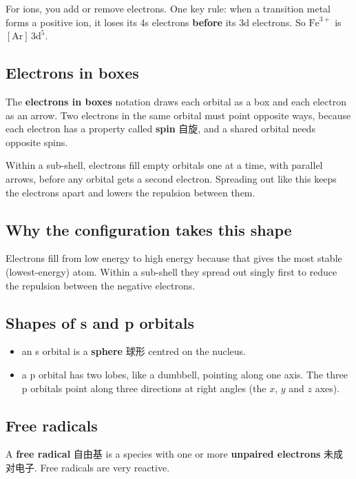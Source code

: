 \documentclass[11pt]{article}
\begin{document}
For ions, you add or remove electrons. One key rule: when a transition metal forms a positive ion, it loses its 4s electrons \textbf{before} its 3d electrons. So $\text{Fe}^{3+}$ is $[\text{Ar}]\,3\text{d}^5$.

\subsection*{Electrons in boxes}

The \textbf{electrons in boxes} notation draws each orbital as a box and each electron as an arrow. Two electrons in the same orbital must point opposite ways, because each electron has a property called \textbf{spin} 自旋, and a shared orbital needs opposite spins.

Within a sub-shell, electrons fill empty orbitals one at a time, with parallel arrows, before any orbital gets a second electron. Spreading out like this keeps the electrons apart and lowers the repulsion between them.

\subsection*{Why the configuration takes this shape}

Electrons fill from low energy to high energy because that gives the most stable (lowest-energy) atom. Within a sub-shell they spread out singly first to reduce the repulsion between the negative electrons.

\subsection*{Shapes of s and p orbitals}

\begin{itemize}
\item an s orbital is a \textbf{sphere} 球形 centred on the nucleus.

\item a p orbital has two lobes, like a dumbbell, pointing along one axis. The three p orbitals point along three directions at right angles (the $x$, $y$ and $z$ axes).

\end{itemize}

\subsection*{Free radicals}

A \textbf{free radical} 自由基 is a species with one or more \textbf{unpaired electrons} 未成对电子. Free radicals are very reactive.
\end{document}

